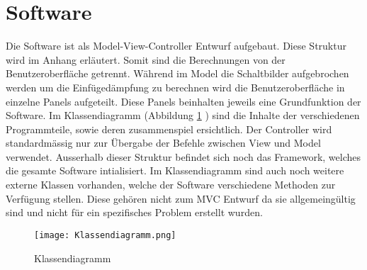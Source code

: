 \section{Software} \label{sec:software}

Die Software ist als Model-View-Controller Entwurf aufgebaut. Diese Struktur wird im Anhang erläutert. Somit sind die Berechnungen von der Benutzeroberfläche getrennt. Während im Model die Schaltbilder aufgebrochen werden um die Einfügedämpfung zu berechnen wird die Benutzeroberfläche in einzelne Panels aufgeteilt. Diese Panels beinhalten jeweils eine Grundfunktion der Software. Im Klassendiagramm (Abbildung \ref{fig:klassendiagramm} ) sind die Inhalte der verschiedenen Programmteile, sowie deren zusammenspiel ersichtlich. Der Controller wird standardmässig nur zur Übergabe der Befehle zwischen View und Model verwendet. Ausserhalb dieser Struktur befindet sich noch das Framework, welches die gesamte Software intialisiert. Im Klassendiagramm sind auch noch weitere externe Klassen vorhanden, welche der Software verschiedene Methoden zur Verfügung stellen. Diese gehören nicht zum MVC Entwurf da sie allgemeingültig sind und nicht für ein spezifisches Problem erstellt wurden.


\begin{figure}[H]
		\centering
		\texttt{[image: Klassendiagramm.png]}
		\label{fig:klassendiagramm}
		\caption{Klassendiagramm}
\end{figure}








